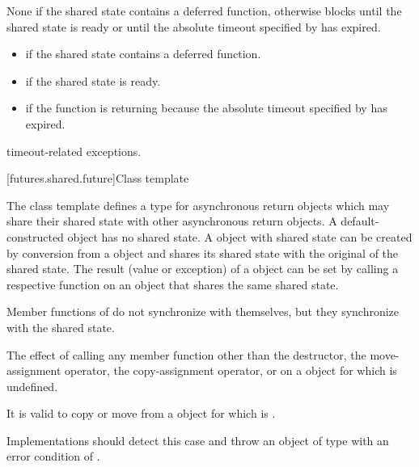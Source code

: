\begin{itemdescr}
\pnum
{}%
\effects
None if the shared state contains a deferred function,
otherwise
blocks until the shared state is ready or until
the absolute timeout specified by  has expired.

\pnum
\returns

\begin{itemize}
\item {} if the shared state contains a deferred
function.

\item {} if the shared state is ready.

\item {} if the function is returning because the
absolute timeout
specified by  has expired.
\end{itemize}

\pnum
\throws
timeout-related exceptions.
\end{itemdescr}


[futures.shared.future]{Class template }

\pnum
The class template  defines a type for asynchronous return objects
which may share their shared state with other asynchronous return
objects. A default-constructed 
object has no shared state. A  object with
shared state can
be created
by conversion from a  object and shares its shared state with the
original  of the shared state.
The result (value or exception) of a  object
can be set by
calling a respective function on an
object that shares the same shared state.

\pnum
\begin{note}
Member functions of  do not synchronize with themselves,
but they synchronize with the shared state.
\end{note}

\pnum
The effect of calling any member function other than the destructor,
the move-assignment operator, the copy-assignment operator, or
 on a  object for which  is undefined.
\begin{note}
It is valid to copy or move from a 
object for which  is .
\end{note}
\begin{note}
Implementations should detect this case and throw an object of type
 with an error condition of .
\end{note}

